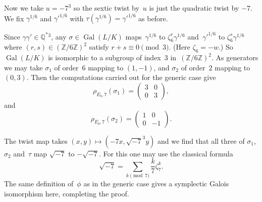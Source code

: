 \documentclass[12pt]{amsart}
\newcommand{\Q}{\mathbb{Q}}
\newcommand{\Z}{\mathbb{Z}}
\DeclareMathOperator{\Gal}{Gal}
\def\legendre#1#2{\displaystyle{\frac{#1}{#2}}}
\numberwithin{equation}{section}
\theoremstyle{definition}
\theoremstyle{remark}
\begin{document}
Now we take $u=-7^3$ so the sextic twist by~$u$ is just the quadratic
twist by $-7$.  We fix $\gamma^{1/6}$ and $\gamma'^{1/6}$ with
$\tau(\gamma^{1/6})=\gamma'^{1/6}$ as before.

Since $\gamma\gamma'\in\Q^*{}^3$, any $\sigma\in\Gal(L/K)$
maps~$\gamma^{1/6}$ to $\zeta_6^r\gamma^{1/6}$ and~$\gamma'^{1/6}$ to
$\zeta_6^s\gamma^{1/6}$ where $(r,s)\in(\Z/6\Z)^2$ satisfy
$r+s\equiv0\pmod3$.  (Here $\zeta_6=-w$.) So $\Gal(L/K)$ is isomorphic
to a subgroup of index~$3$ in~$(\Z/6\Z)^2$.  As generators we may take
$\sigma_1$ of order~$6$ mapping to $(1,-1)$, and $\sigma_2$ of
order~$2$ mapping to $(0,3)$.  Then the computations carried out for
the generic case give
\[
   \rho_{E_b,7}(\sigma_1) = \begin{pmatrix}3&0\\0&3   \end{pmatrix},
\]
and
\[
   \rho_{E_b,7}(\sigma_2) = \begin{pmatrix}1&0\\0&-1   \end{pmatrix}.
\]

The twist map takes $(x,y)\mapsto(-7x,\sqrt{-7}^3y)$ and we find that
all three of $\sigma_1$, $\sigma_2$ and~$\tau$ map $\sqrt{-7}$ to
$-\sqrt{-7}$.  For this one may use the classical formula
\[
   \sqrt{-7} = \sum_{k\pmod7}\legendre{k}{7}\zeta_7^k.
\]
The same definition of~$\phi$ as in the generic case gives a
symplectic Galois isomorphism here, completing the proof.
\end{document}
